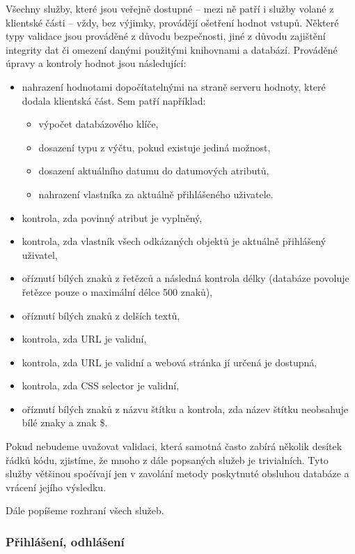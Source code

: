 Všechny služby, které jsou veřejně dostupné -- mezi ně patří i služby volané z klientské části -- vždy, bez výjimky, provádějí ošetření hodnot vstupů.
Některé typy validace jsou prováděné z důvodu bezpečnosti, jiné z důvodu zajištění integrity dat či omezení danými použitými knihovnami a databází.
Prováděné úpravy a kontroly hodnot jsou následující:
\begin{itemize}
	\item nahrazení hodnotami dopočítatelnými na straně serveru hodnoty, které dodala klientská část.
		Sem patří například:
		\begin{itemize}
			\item výpočet databázového klíče,
			\item dosazení typu z výčtu, pokud existuje jediná možnost,
			\item dosazení aktuálního datumu do datumových atributů,
			\item nahrazení vlastníka za aktuálně přihlášeného uživatele.
		\end{itemize}
	\item kontrola, zda povinný atribut je vyplněný,
	\item kontrola, zda vlastník všech odkázaných objektů je aktuálně přihlášený uživatel,
	\item oříznutí bílých znaků z řetězců a následná kontrola délky (databáze povoluje řetězce pouze o maximální délce 500 znaků),
	\item oříznutí bílých znaků z delších textů,
	\item kontrola, zda URL je validní,
	\item kontrola, zda URL je validní a webová stránka jí určená je dostupná,
	\item kontrola, zda CSS selector je validní,
	\item oříznutí bílých znaků z názvu štítku a kontrola, zda název štítku neobsahuje bílé znaky a znak \$.
\end{itemize}

Pokud nebudeme uvažovat validaci, která samotná často zabírá několik desítek řádků kódu, zjistíme, že mnoho z dále popsaných služeb je trivialních.
Tyto služby většinou spočívají jen v zavolání metody poskytnuté obsluhou databáze a vrácení jejího výsledku.

\bigskip
Dále popíšeme rozhraní všech služeb.

\subsubsection{Přihlášení, odhlášení}


